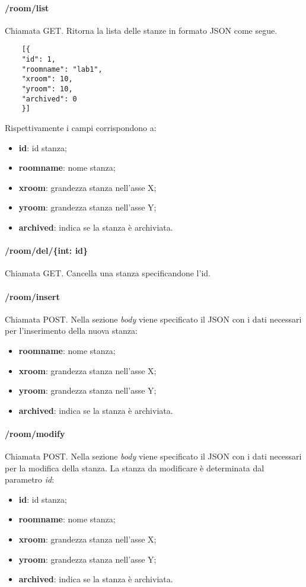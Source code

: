 \paragraph{/room/list}
Chiamata GET. Ritorna la lista delle stanze in formato JSON come segue.	\\
\begin{center}
	\begin{lstlisting}
	[{
	"id": 1,
	"roomname": "lab1",
	"xroom": 10,
	"yroom": 10,
	"archived": 0
	}]
	\end{lstlisting}
\end{center}
Rispettivamente i campi corrispondono a:
\begin{itemize}
	\item \textbf{id}: id stanza;
	\item \textbf{roomname}: nome stanza;
	\item \textbf{xroom}: grandezza stanza nell'asse X;
	\item \textbf{yroom}: grandezza stanza nell'asse Y;
	\item \textbf{archived}: indica se la stanza è archiviata.	
\end{itemize}
\paragraph{/room/del/\{int: id\}}
Chiamata GET. Cancella una stanza specificandone l'id.
\paragraph{/room/insert}
Chiamata POST. Nella sezione \textit{body} viene specificato il JSON con i dati necessari per l'inserimento della nuova stanza:
\begin{itemize}
	\item \textbf{roomname}: nome stanza;
	\item \textbf{xroom}: grandezza stanza nell'asse X;
	\item \textbf{yroom}: grandezza stanza nell'asse Y;
	\item \textbf{archived}: indica se la stanza è archiviata.		
\end{itemize}

\paragraph{/room/modify}
Chiamata POST. Nella sezione \textit{body} viene specificato il JSON con i dati necessari per la modifica della stanza. La stanza da modificare è determinata dal parametro \textit{id}:
\begin{itemize}
	\item \textbf{id}: id stanza;
	\item \textbf{roomname}: nome stanza;
	\item \textbf{xroom}: grandezza stanza nell'asse X;
	\item \textbf{yroom}: grandezza stanza nell'asse Y;
	\item \textbf{archived}: indica se la stanza è archiviata.	
\end{itemize}
